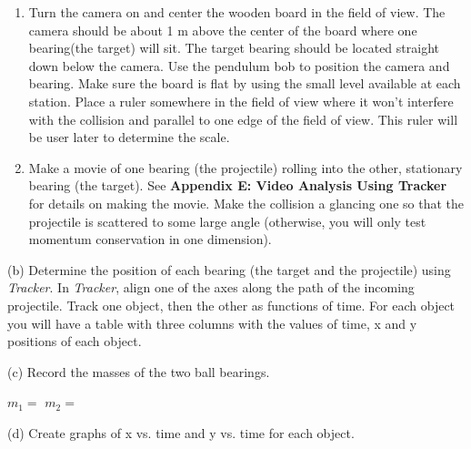 \begin{enumerate}
\item Turn the camera on and center the wooden board in the field of view. The camera
should be about 1 m above the center of the board where one bearing(the target)
will sit. The target bearing should be located straight down below the camera.
Use the pendulum bob to position the camera and bearing. Make sure the board
is flat by using the small level available at each station. Place a ruler somewhere
in the field of view where it won't interfere with the collision and parallel
to one edge of the field of view. This ruler will be user later to determine
the scale. 
\item Make a movie of one bearing (the projectile) rolling into the other, stationary
bearing (the target). See \textbf{Appendix E: Video Analysis Using Tracker} 
for details on making the movie. Make the collision a glancing one so that the 
projectile is scattered to some large angle (otherwise, you will only test 
momentum conservation in one dimension).
\end{enumerate}
(b) Determine the position of each bearing (the target and the projectile) 
using \textit{Tracker}. In \textit{Tracker}, align one of the axes along the 
path of the incoming projectile. Track one object, then the other as functions 
of time. For each object you will have a table with three columns with the 
values of time, x and y positions of each object.
\vspace{5mm}


(c) Record the masses of the two ball bearings.
\vspace{5mm}

\( m_{1} =\)  \hfill{}\( m_{2} =\)  \hfill{}
\vspace{5mm}

(d) Create graphs of x vs. time and y vs. time for each object.
\vspace{7mm}

